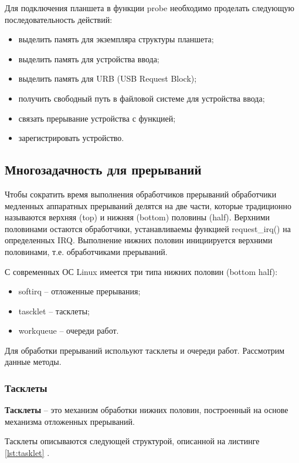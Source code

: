 Для подключения планшета в функции probe необходимо проделать следующую последовательность действий:

\begin{itemize}
    \item выделить память для экземпляра структуры планшета;
    \item выделить память для устройства ввода;
    \item выделить память для URB (USB Request Block);
    \item получить свободный путь в файловой системе для устройства ввода;
    \item связать прерывание устройства с функцией;
    \item зарегистрировать устройство.
\end{itemize}

\subsection{Многозадачность для прерываний}

Чтобы сократить время выполнения обработчиков прерываний обработчики медленных аппаратных прерываний делятся на две части, которые традиционно называются верхняя (top) и нижняя (bottom) половины (half). Верхними половинами остаются обработчики, устанавливаемы функцией request\_irq() на определенных IRQ. Выполнение нижних половин инициируется верхними половинами, т.е. обработчиками прерываний.

С современных ОС Linux имеется три типа нижних половин (bottom half):

\begin{itemize}
    \item softirq -- отложенные прерывания;
    \item tascklet -- тасклеты;
    \item workqueue -- очереди работ.
\end{itemize}

Для обработки прерываний испольуют тасклеты и очереди работ. Рассмотрим данные методы.

\subsubsection{Тасклеты}

\textbf{Тасклеты} -- это механизм обработки нижних половин, построенный на основе механизма отложенных прерываний.

Тасклеты описываются следующей структурой, описанной на листинге \ref{lst:tasklet} \cite{Tasklets}.

